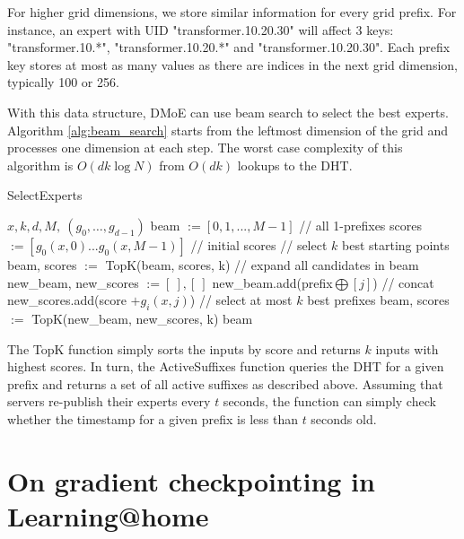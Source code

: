 For higher grid dimensions, we store similar information for every grid prefix. For instance, an expert with UID "transformer.10.20.30" will affect 3 keys: "transformer.10.*", "transformer.10.20.*" and "transformer.10.20.30". Each prefix key stores at most as many values as there are indices in the next grid dimension, typically 100 or 256.

With this data structure, DMoE can use beam search to select the best experts. Algorithm \ref{alg:beam_search} starts from the leftmost dimension of the grid and processes one dimension at each step. The worst case complexity of this algorithm is $O(d k \log N)$ from  $O(d k)$ lookups to the DHT.


\begin{algorithm}[h]
   \caption{SelectExperts}
   \label{alg:beam_search}
\begin{algorithmic}
    $x, k, d, M,\ (g_0, \ldots, g_{d-1})$
   \STATE beam $ := [0, 1, ..., M - 1]$ \quad \quad \quad \quad \quad \quad \quad // all 1-prefixes
   \STATE scores $ := [g_0(x, 0) ... g_0(x, M - 1)]$ \quad \quad  \quad // initial scores
   \STATE // select $k$ best starting points
   \STATE beam, scores $:=$ TopK(beam, scores, k)
   \STATE // expand all candidates in beam
   \STATE new\_beam, new\_scores $ := [\ ], [\ ]$
       \STATE new\_beam.add(prefix$ \bigoplus [j]$) // concat
       \STATE new\_scores.add(score $ + g_i(x, j)$)
   \ENDFOR
   \ENDFOR
   \STATE // select at most $k$ best prefixes
   \STATE beam, scores $:=$ TopK(new\_beam, new\_scores, k)
   \ENDFOR
    beam
\end{algorithmic}
\end{algorithm}

The TopK function simply sorts the inputs by score and returns $k$ inputs with highest scores. In turn, the ActiveSuffixes function queries the DHT for a given prefix and returns a set of all active suffixes as described above. Assuming that servers re-publish their experts every $t$ seconds, the function can simply check whether the timestamp for a given prefix is less than $t$ seconds old.

\vspace{-4pt}
\section{On gradient checkpointing in Learning@home}\label{appendix:checkpoints}
\vspace{-2px}

